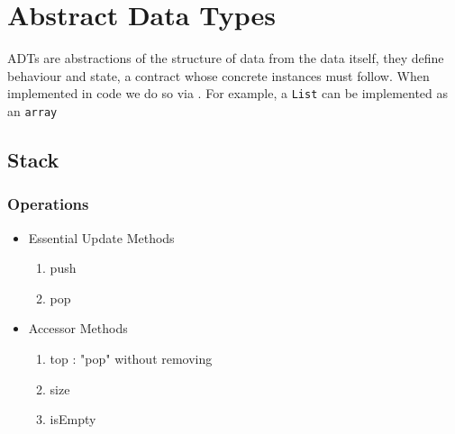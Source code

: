 \section{Abstract Data Types}


\par{ADTs are abstractions of the structure of data from the data itself, they define behaviour and state, a contract whose concrete instances must follow. When implemented in code we do so via . For example, a \texttt{List} can be implemented as an \texttt{array}}


		\subsection{Stack}


  
		\subsubsection{Operations}

				\begin{itemize} 
								\item Essential Update Methods 
						\begin{enumerate}
								\item push
								\item pop
						\end{enumerate}
				\end{itemize}
				\begin{itemize}
								\item Accessor Methods
						\begin{enumerate}
								\item top : "pop" without removing
								\item size
								\item isEmpty
						\end{enumerate}
				\end{itemize}


